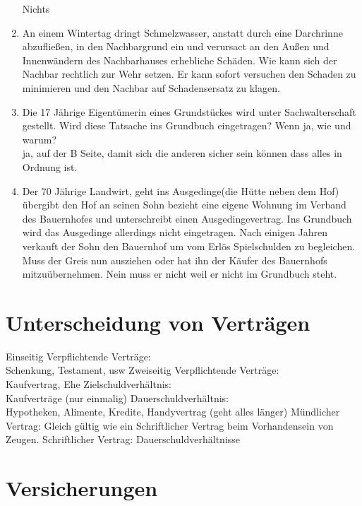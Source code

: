 \documentclass[a4paper]{report}
\begin{document}
\begin{enumerate}
Nichts
\item An einem Wintertag dringt Schmelzwasser, anstatt durch eine Darchrinne abzufließen, in den Nachbargrund ein und verursact an den Außen und Innenwändern des Nachbarhauses erhebliche Schäden. Wie kann sich der Nachbar rechtlich zur Wehr setzen.
Er kann sofort versuchen den Schaden zu minimieren und den Nachbar auf Schadensersatz zu klagen.
\item Die 17 Jährige Eigentümerin eines Grundstückes wird unter Sachwalterschaft gestellt. Wird diese Tatsache ins Grundbuch eingetragen? Wenn ja, wie und warum?\\
ja, auf der B Seite, damit sich die anderen sicher sein können dass alles in Ordnung ist.
\item Der 70 Jährige Landwirt, geht ins Ausgedinge(die Hütte neben dem Hof) übergibt den Hof an seinen Sohn bezieht eine eigene Wohnung im Verband des Bauernhofes und unterschreibt einen Ausgedingevertrag. Ins Grundbuch wird das Ausgedinge allerdings nicht eingetragen. Nach einigen Jahren verkauft der Sohn den Bauernhof um vom Erlös Spielschulden zu begleichen. Muss der Greis nun ausziehen oder hat ihn der Käufer des Bauernhofs mitzuübernehmen.
Nein muss er nicht weil er nicht im Grundbuch steht. 
\end{enumerate}

\section{Unterscheidung von Verträgen}
Einseitig Verpflichtende Verträge:\\
Schenkung, Testament, usw
Zweiseitig Verpflichtende Verträge:\\
Kaufvertrag, Ehe
Zielschuldverhältnis:\\
Kaufverträge (nur einmalig)
Dauerschuldverhältnis:\\
Hypotheken, Alimente, Kredite, Handyvertrag (geht alles länger)
Mündlicher Vertrag:
Gleich gültig wie ein Schriftlicher Vertrag beim Vorhandensein von Zeugen. 
Schriftlicher Vertrag:
Dauerschuldverhältnisse 

\section{Versicherungen}
\end{document}
